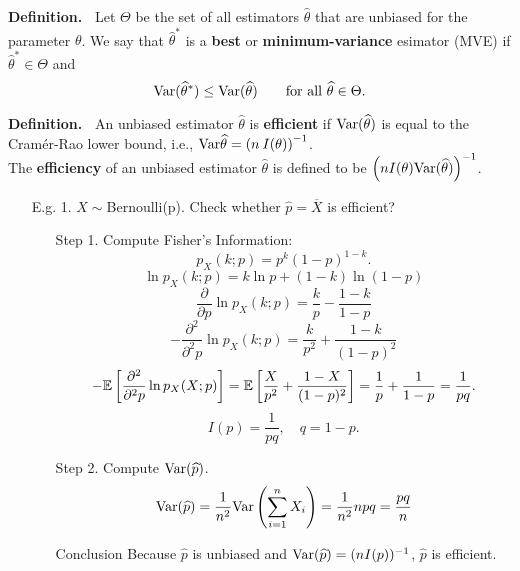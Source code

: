 \begin{frame}

{\bf Definition.~} Let $\Theta$ be the set of all estimators $\widehat{\theta}$ that are unbiased for the parameter $\theta$. We say that $\widehat{\theta}^*$ is a {\bf best} or {\bf minimum-variance} esimator (MVE) if $\widehat{\theta}^*\in\Theta$ and
\[
\text{Var}(\widehat{\theta}^*) \le \text{Var}(\widehat{\theta})\qquad \text{for all $\widehat{\theta}\in\Theta$}.
\]
\vfill

{\bf Definition.~} An unbiased estimator $\widehat{\theta}$ is {\bf efficient} if $\text{Var}(\widehat{\theta})$ is equal to the Cram\'er-Rao lower bound, i.e.,  $\text{Var}{\widehat{\theta}} = \left(n\: I(\theta)\right)^{-1}$.\\
The {\bf efficiency} of an unbiased estimator $\widehat{\theta}$ is defined to be $\left(n I(\theta) \text{Var}(\widehat{\theta})\right)^{-1}$.
 \vfill
 \begin{center}
\end{center}
\end{frame}
\begin{frame}
\begin{enumerate}
 \item[E.g. 1.] $X\sim$Bernoulli(p). Check whether $\widehat{p}=\overline{X}$ is efficient?\\[1em]
 \begin{itemize}
  \item[Step 1.] Compute Fisher's Information:
  \[
 p_X(k;p) = p^k(1-p)^{1-k}.
 \]\pause
 \[
 \ln p_X(k;p) = k\ln p +(1-k)\ln (1-p)
 \]\pause
 \[
 \frac{\partial}{\partial p} \ln p_X(k;p) = \frac{k}{p} -\frac{1-k}{1-p}
 \]\pause
 \[
 -\frac{\partial^2}{\partial^2 p} \ln p_X(k;p) = \frac{k}{p^2} +\frac{1-k}{(1-p)^2}
 \]\pause
 \[
 -\mathbb{E}\left[\frac{\partial^2}{\partial^2 p} \ln p_X(X;p)\right]
 = \mathbb{E}\left[\frac{X}{p^2} +\frac{1-X}{(1-p)^2}\right]
 =\frac{1}{p} + \frac{1}{1-p} =\frac{1}{pq}.
 \]\pause
 \[
 \boxed{I(p) = \frac{1}{pq}, \quad q=1-p.}
 \]
 \item[Step 2.] Compute $\text{Var}(\widehat{p})$.
 \[
 \text{Var}(\widehat{p}) = \frac{1}{n^2}\text{Var}\left(\sum_{i=1}^n X_i\right) = \frac{1}{n^2} n pq = \frac{pq}{n}
 \]
 \item[Conclusion] Because $\widehat{p}$ is unbiased and $ \text{Var}(\widehat{p}) = (n I(p))^{-1}$, $\widehat{p}$ is efficient.
 \end{itemize}
 \end{enumerate}
\end{frame}
